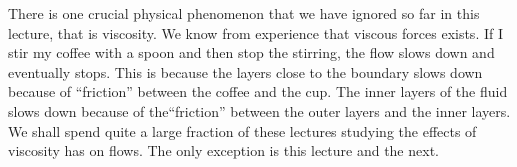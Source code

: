 There is one crucial physical phenomenon that we have ignored so far in
this lecture, that is viscosity. We know from experience that viscous
forces exists.  If I stir my coffee with a spoon and then stop the
stirring, the flow slows down and eventually stops. This is because the
layers close to the boundary slows down because of ``friction''
between the coffee and the cup. The inner layers of the fluid slows
down because of the``friction'' between the outer layers and the
inner layers.  We shall spend quite a large fraction of these lectures
studying the effects of viscosity has on flows. The only exception is
this lecture and the next. 

